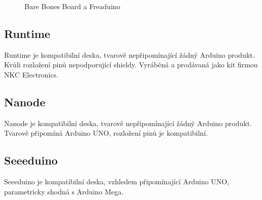 	\begin{figure}[!ht]
	\vspace{-10pt}	
    \centering
			\hspace*{5mm}
					\caption{Bare Bones Board a Freaduino}
					\vspace{-20pt}	
	\end{figure}	
	
	\subsection{Runtime} 
	Runtime je kompatibilní deska, tvarově nepřipomínající žádný Arduino produkt. Kvůli rozložení pinů nepodporující shieldy. Vyráběná a prodávaná jako kit firmou NKC Electronics.
	
	\subsection{Nanode} 
	Nanode je kompatibilní deska, tvarově nepřipomínající žádný Arduino produkt. Tvarově připomíná Arduino UNO, rozložení pinů je kompatibilní.
	
	\subsection{Seeeduino} 
	Seeeduino je kompatibilní deska, vzhledem připomínající Arduino UNO, parametricky shodná s Arduino Mega.
	
